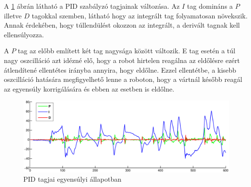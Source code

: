 A \ref{pidFig} ábrán látható a PID szabályzó tagjainak változása. Az $I$ tag domináns a $P$ illetve $D$ tagokkal szemben, látható hogy az integrált tag folyamatosan növekszik. Annak érdekében, hogy túllendülést okozzon az integrált, a derivált tagnak kell ellensúlyozza.

A $P$ tag az előbb említett két tag nagysága között változik. E tag esetén a túl nagy oszcilláció azt idézné elő, hogy a robot hirtelen reagálna az eldőlésre ezért átlendítené ellentétes irányba annyira, hogy eldőlne. Ezzel ellentétbe, a kisebb oszcilláció hatására megfigyelhető lenne a roboton, hogy a vártnál később reagál az egyensúly korrigálására és ebben az esetben is eldőlne.

\begin{figure}[!htb]
	\begin{center}
		\includegraphics[width=1.0\linewidth]{images/pid.eps}
	\end{center}
	\caption{PID tagjai egyensúlyi állapotban}
	\label{pidFig}
\end{figure}
